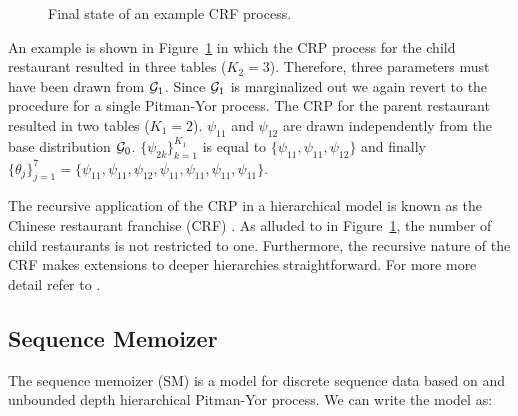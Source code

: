 \begin{figure}[h!tbp] 
	\begin{center}
		\label{figHPY}
		\caption{Final state of an example CRF process.}
	\end{center} 

\end{figure} 

An example is shown in Figure~\ref{figHPY} in which the CRP process for the child restaurant resulted in three tables ($K_2 = 3$).  Therefore, three parameters must have been drawn from $\G_1$.  Since $\G_1$ is marginalized out we again revert to the procedure for a single Pitman-Yor process. The CRP for the parent restaurant resulted in two tables ($K_1 = 2$).  $\psi_{11}$ and $\psi_{12}$ are drawn independently from the base distribution $\G_0$.  $\{ \psi_{2k} \}_{k = 1}^{K_1}$ is equal to $\{ \psi_{11}, \psi_{11}, \psi_{12} \}$ and finally  $\{ \theta_j \}_{j = 1}^7 = \{ \psi_{11}, \psi_{11}, \psi_{12},\psi_{11},\psi_{11}, \psi_{11}, \psi_{11}\}$.

The recursive application of the CRP in a hierarchical model is known as the Chinese restaurant franchise (CRF) \cite{Teh2006b}.  As alluded to in Figure~\ref{figHPY}, the number of child restaurants is not restricted to one.  Furthermore, the recursive nature of the CRF makes extensions to deeper hierarchies straightforward. For more more detail refer to \cite{Teh2006b, Teh2006a}.

\subsection{Sequence Memoizer}

The sequence memoizer (SM) \cite{Wood2009} is a model for discrete sequence data based on and unbounded depth hierarchical Pitman-Yor process. We can write the model as:

